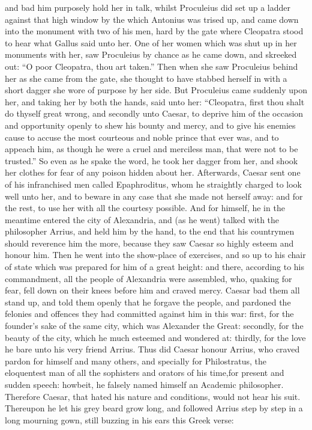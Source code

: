 \documentclass{book}
\begin{document}
and bad him purposely hold her in talk, whilst Proculeius did set up a ladder
against that high window by the which Antonius was trised up, and came
down into the monument with two of his men, hard by the gate where Cleopatra
stood to hear what Gallus said unto her. One of her women which was shut up in
her monuments with her, saw Proculeius by chance as he came down, and
skreeked out: ``O poor Cleopatra, thou art taken.'' Then when she saw
Proculeius behind her as she came from the gate, she thought to have stabbed
herself in with a short dagger she wore of purpose by her side. 
But   Proculeius came suddenly upon her, and taking her by
both the hands, said unto her: ``Cleopatra, first thou shalt do thyself great
wrong, and secondly unto Caesar, to deprive him of the occasion and
opportunity openly to shew his bounty and mercy, and to give his enemies cause
to accuse the most courteous and noble prince that ever was, and to appeach
him, as though he were a cruel and merciless man, that were not to be
trusted.'' So even as he spake the word, he took her dagger from her, and shook
her clothes for fear of any poison hidden about her. Afterwards, Caesar sent
one of his infranchised men called Epaphroditus, whom he straightly
charged to look well unto her, and to beware in any case that she made not
herself away: and for the rest, to use her with all the courtesy possible. 
And  for himself, he in
the meantime entered the city of Alexandria, and (as he went) talked
with the philosopher Arrius, and held him by the hand, to the end
that his countrymen should reverence him the more, because they saw
Caesar so highly esteem and honour him. Then  he went into the show-place of
exercises, and so up to his chair of state which was prepared for
him of a great height: and there, according to his commandment, all
the people of Alexandria were assembled, who, quaking for fear, fell
down on their knees before him and craved mercy. Caesar bad them
all stand up, and told them openly that he forgave the people, and
pardoned the felonies and offences they had committed against him in
this war: first, for the founder's sake of the same city, which was
Alexander the Great: secondly, for the beauty of the city, which he
much esteemed and wondered at: thirdly, for the love he bare unto
his very friend Arrius. Thus  did Caesar
honour Arrius, who craved pardon for himself and many others, and
specially for Philostratus, the eloquentest man of all the sophisters
and orators of his time,for present and sudden speech: howbeit, he
falsely named himself an Academic philosopher. Therefore Caesar, that
hated his nature and conditions, would not hear his suit. Thereupon he
let his grey beard grow long, and followed Arrius step by step in a
long mourning gown, still buzzing in his ears this Greek verse:
\end{document}
